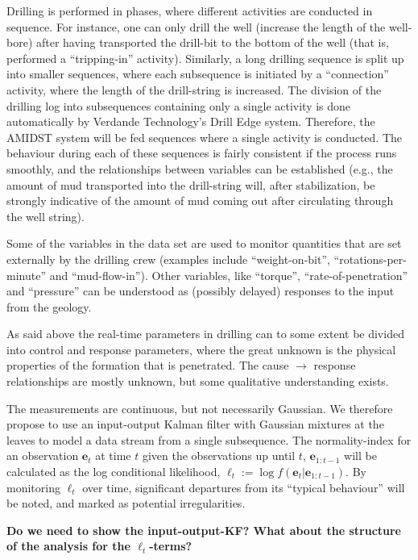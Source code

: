 Drilling is performed in phases, where different activities are conducted in sequence. For instance, one can only drill the well (increase the length of the well-bore) after having transported the drill-bit to the bottom of the well (that is, performed a ``tripping-in'' activity). Similarly, a long drilling sequence is split up into smaller sequences, where each subsequence is initiated by a ``connection'' activity, where the length of the drill-string is increased.
The division of the drilling log into subsequences containing only a single activity is done automatically by Verdande Technology's Drill Edge system. 
Therefore, the AMIDST system will be fed sequences where a single activity is conducted. 
The behaviour during each of these sequences  is fairly consistent if the process runs smoothly, and the relationships between variables can be established (e.g., the amount of mud transported into the drill-string will, after stabilization, be strongly indicative of the amount of mud coming out after circulating through the well string). 

Some of the variables in the data set are used to monitor quantities that are set externally by the drilling crew (examples include ``weight-on-bit'', ``rotations-per-minute'' and ``mud-flow-in''). Other variables, like ``torque'', ``rate-of-penetration'' and ``pressure'' can be understood as  (possibly delayed) responses to the input from the geology. 

As said above the real-time parameters in drilling can to some extent be divided into control and response parameters, where the great unknown is the physical properties of the formation that is penetrated.  The cause $\rightarrow$ response relationships are mostly unknown, but some qualitative understanding exists. 

The measurements are continuous, but not necessarily Gaussian. We therefore propose to use an input-output Kalman filter with Gaussian mixtures at the leaves to model a data stream from a single subsequence. The normality-index for an observation ${\bm e}_t$ at time $t$ given the observations up until $t$, ${\bm e}_{1:t-1}$ will be calculated as the log conditional likelihood,  $\ell_t := \log f\left({\bm e}_t|{\bm e}_{1:t-1}\right)$. By monitoring  $\ell_t$ over time, significant departures from its ``typical behaviour'' will be noted, and marked as potential irregularities.

{\bf Do we need to show the input-output-KF? What about the structure of the analysis for the $\ell_t$-terms?}


